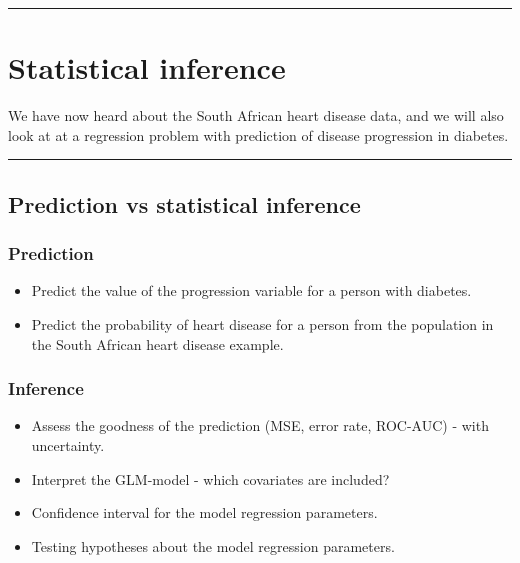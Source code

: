 \documentclass[
  letterpaper,
  DIV=11,
  numbers=noendperiod]{scrartcl}
\providecommand{\tightlist}{%
  \setlength{\itemsep}{0pt}\setlength{\parskip}{0pt}}\usepackage{longtable,booktabs,array}
\begin{document}
\begin{center}\rule{0.5\linewidth}{0.5pt}\end{center}

\hypertarget{statistical-inference}{%
\section{Statistical inference}\label{statistical-inference}}

We have now heard about the South African heart disease data, and we
will also look at at a regression problem with prediction of disease
progression in diabetes.

\begin{center}\rule{0.5\linewidth}{0.5pt}\end{center}

\hypertarget{prediction-vs-statistical-inference}{%
\subsection{Prediction vs statistical
inference}\label{prediction-vs-statistical-inference}}

\hypertarget{prediction}{%
\subsubsection{Prediction}\label{prediction}}

\begin{itemize}
\tightlist
\item
  Predict the value of the progression variable for a person with
  diabetes.
\item
  Predict the probability of heart disease for a person from the
  population in the South African heart disease example.
\end{itemize}

\hypertarget{inference}{%
\subsubsection{Inference}\label{inference}}

\begin{itemize}
\tightlist
\item
  Assess the goodness of the prediction (MSE, error rate, ROC-AUC) -
  with uncertainty.
\item
  Interpret the GLM-model - which covariates are included?
\item
  Confidence interval for the model regression parameters.
\item
  Testing hypotheses about the model regression parameters.
\end{itemize}
\end{document}
